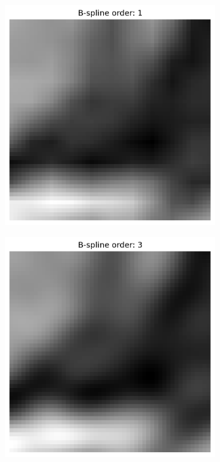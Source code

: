 \documentclass[10pt,twoside]{book}
\begin{document}
\begin{figure}
\begin{subfigure}[b]{0.48\textwidth}
     \caption{}
     \label{fig:interpolation2D_BSplineOrder0}
  \end{subfigure}
  \begin{subfigure}[b]{0.48\textwidth}
     \includegraphics[width=\textwidth]{interpolation2D_BSplineOrder1}
     \caption{}
     \label{fig:interpolation2D_BSplineOrder1}
  \end{subfigure}
  \hfill
  \begin{subfigure}[b]{0.48\textwidth}
     \includegraphics[width=\textwidth]{interpolation2D_BSplineOrder3}

\end{subfigure}
\end{figure}
\end{document}
